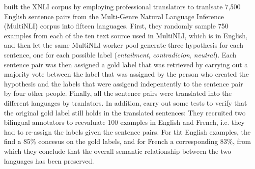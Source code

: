 \cite{conneau2018xnli} built the XNLI corpus by employing professional translators to tranlsate
7,500 English sentence pairs from the Multi-Genre Natural Language Inference (MultiNLI) corpus
\cite{williams2017broad} into fifteen languages.
First, they randomly sample 750 examples from each of the ten text source used in MultiNLI, which
is in English, and then let the same MultiNLI worker pool generate three hypothesis for each
sentence, one for each possible label (\emph{entailment}, \emph{contradicion}, \emph{neutral}).
Each sentence pair was then assigned a gold label that was retrieved by carrying out a majority
vote between the label that was assigned by the person who created the hypothesis and the labels
that were assigend indepentently to the sentence pair by four other people.
Finally, all the sentence pairs were translated into the different languages by tranlators.
In addition, \cite{conneau2018xnli} carry out some tests to verify that the original gold label
still holds in the translated sentences:
They recruited two bilingual annotators to reevaluate 100 examples in English and French, i.e.
they had to re-assign the labels given the sentence pairs.
For tht English examples, the find a 85\% concesus on the gold labels, and for French a
corresponding 83\%, from which they conclude that the overall semantic relationship between the
two languages has been preserved.



